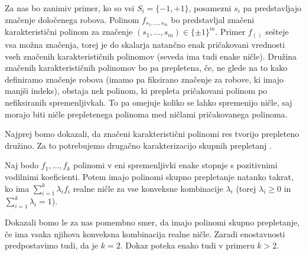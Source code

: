 Za nas bo zanimiv primer, ko so vsi \(S_i=\{-1, +1\}\), posamezni \(s_i\) pa predstavljajo značenje določenega robova. Polinom \(f_{s_1, \ldots, s_m}\) bo predstavljal značeni karakteristični polinom za značenje \((s_1,\ldots, s_m) \in \{\pm 1\}^m\). Primer \(f_{()}\) sešteje vsa možna značenja, torej je do skalarja natančno enak pričakovani vrednosti vseh značenih karakterističnih polinomov (seveda ima tudi enake ničle). Družina značenih karakterističnih polinomov bo pa prepletena, če, ne glede na to kako definiramo značenje robova (imamo pa fiksirano značenje za robove, ki imajo manjši indeks), obstaja nek polinom, ki prepleta pričakovani polinom po nefiksiranih spremenljivkah. To pa omejuje koliko se lahko spremenijo ničle, saj morajo biti ničle prepletenega polinoma med ničlami pričakovanega polinoma.

Najprej bomo dokazali, da značeni karakteristični polinomi res tvorijo prepleteno družino. Za to potrebujemo drugačno karakterizacijo skupnih prepletanj \cite{DEDIEU1992269}.
\begin{izrek}\label{konveksne-kombinacije-prepletenih}
    Naj bodo \(f_1, \ldots, f_k\) polinomi v eni spremenljivki enake stopnje s pozitivnimi vodilnimi koeficienti. Potem imajo polinomi skupno prepletanje natanko takrat, ko ima \(\sum_{i=1}^k \lambda_i f_i\) realne ničle za vse konveksne kombinacije \(\lambda_i\) (torej \(\lambda_i\geq 0\) in \(\sum_{i=1}^k \lambda_i=1\)).
\end{izrek}
Dokazali bomo le za nas pomembno smer, da imajo polinomi skupno prepletanje, če ima vsaka njihova konveksna kombinacija realne ničle. Zaradi enostavnosti predpostavimo tudi, da je \(k=2\). Dokaz poteka enako tudi v primeru \(k>2\).
